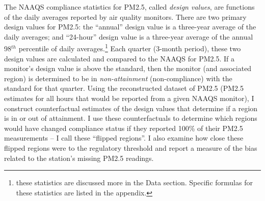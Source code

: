The NAAQS compliance statistics for PM2.5, called \textit{design values}, are functions of the daily averages reported by air quality monitors.
%
There are two primary design values for PM2.5: the ``annual'' design value is a three-year average of the daily averages; and ``24-hour'' design value is a three-year average of the annual 98$^{th}$ percentile of daily averages.\footnote{these statistics are discussed more in the Data section. Specific formulas for these statistics are listed in the appendix.}
%
Each quarter (3-month period), these two design values are calculated and compared to the NAAQS for PM2.5.
%
If a monitor's design value is above the standard, then the monitor (and associated region) is determined to be in \textit{non-attainment} (non-compliance) with the standard for that quarter.
%
Using the reconstructed dataset of PM2.5 (PM2.5 estimates for all hours that would be reported from a given NAAQS monitor), I construct counterfactual estimates of the design values that determine if a region is in or out of attainment.
%
I use these counterfactuals to determine which regions would have changed compliance status if they reported 100\% of their PM2.5 measurements -- I call these ``flipped regions''.
%
I also examine how close these flipped regions were to the regulatory threshold and report a measure of the bias related to the station's missing PM2.5 readings.





